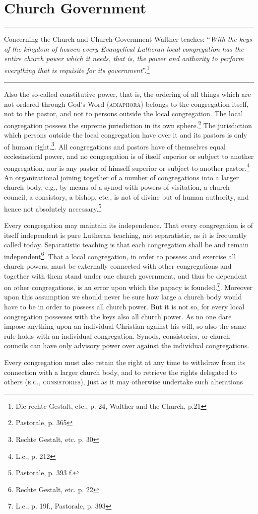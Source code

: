 \chapter{Church Government}

\hrule
\vspace{.30cm}
Concerning the Church and Church-Government Walther teaches: “\textit{With the keys of the kingdom of heaven every Evangelical Lutheran local congregation has the entire church power which it needs, that is, the power and authority to perform everything that is requisite for its government}”.\footnote{Die rechte Gestalt, etc., p. 24, Walther and the Church, p.21}
\vspace{.30cm}
\hrule
\vspace{1.25cm}
Also the so-called constitutive power, that is, the ordering of all things which are not ordered through God’s Word {\scriptsize\textsc{(adiaphora)}} belongs to the congregation itself, not to the pastor, and not to persons outside the local congregation.  The local congregation possess the supreme jurisdiction in its own sphere.\footnote{Pastorale, p. 365}  The jurisdiction which persons outside the local congregation have over it and its pastors is only of human right.\footnote{Rechte Gestalt, etc. p. 30}.  All congregations and pastors have of themselves equal ecclesiastical power, and no congregation is of itself superior or subject to another congregation, nor is any pastor of himself superior or subject to another pastor.\footnote{L.c., p. 212}  An organizational joining together of a number of congregations into a larger church body, e.g., by means of a synod with powers of visitation, a church council, a consistory, a bishop, etc., is not of divine but of human authority, and hence not absolutely necessary.\footnote{Pastorale, p. 393 f.} \par Every congregation may maintain its independence.  That every congregation is of itself independent is pure Lutheran teaching, not separatistic, as it is frequently called today.  Separatistic teaching is that each congregation shall be and remain independent\footnote{Rechte Gestalt, etc. p. 22}.  That a local congregation, in order to possess and exercise all church powers, must be externally connected with other congregations and together with them stand under one church government, and thus be dependent on other congregations, is an error upon which the papacy is founded.\footnote{L.c., p. 19f., Pastorale, p. 393}.  Moreover upon this assumption we should never be sure how large a church body would have to be in order to possess all church power.  But it is not so, for every local congregation possesses with the keys also all church power.  As no one dare impose anything upon an individual Christian against his will, so also the same rule holds with an individual congregation.  Synods, consistories, or church councils can have only advisory power over against the individual congregations. \par Every congregation must also retain the right at any time to withdraw from its connection with a larger church body, and to retrieve the rights delegated to others {\scriptsize\textsc{(e.g., consistories)}}, just as it may otherwise undertake such alterations 